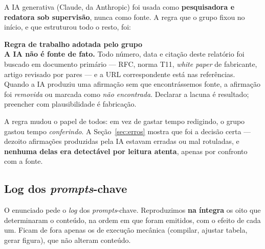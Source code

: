 \documentclass[11pt,a4paper]{article}
\newcommand{\destaque}[2]{%
  \begin{center}\begin{minipage}{0.96\textwidth}
  \colorbox{fundo}{\begin{minipage}{\dimexpr\linewidth-2\fboxsep}
  \vspace{2pt}\textbf{\color{azul}\small #1}\\[1pt]\footnotesize #2\vspace{3pt}
  \end{minipage}}\end{minipage}\end{center}}
\begin{document}
A IA generativa (Claude, da Anthropic) foi usada como \textbf{pesquisadora e redatora sob
supervisão}, nunca como fonte. A regra que o grupo fixou no início, e que estruturou todo o resto,
foi:

\destaque{Regra de trabalho adotada pelo grupo}{%
\textbf{A IA não é fonte de fato.} Todo número, data e citação deste relatório foi buscado em
documento primário --- RFC, norma T11, \textit{white paper} de fabricante, artigo revisado por pares
--- e a URL correspondente está nas referências. Quando a IA produziu uma afirmação sem que
encontrássemos fonte, a afirmação foi \emph{removida} ou marcada como \emph{não encontrada}.
Declarar a lacuna é resultado; preencher com plausibilidade é fabricação.}

A regra mudou o papel de todos: em vez de gastar tempo redigindo, o grupo gastou tempo
\emph{conferindo}. A Seção~\ref{sec:erros} mostra que foi a decisão certa --- dezoito afirmações
produzidas pela IA estavam erradas ou mal rotuladas, e \textbf{nenhuma delas era detectável por
leitura atenta}, apenas por confronto com a fonte.

\subsection{Log dos \textit{prompts}-chave}
\label{sec:prompts}

O enunciado pede o \emph{log} dos \textit{prompts}-chave. Reproduzimos \textbf{na íntegra} os oito
que determinaram o conteúdo, na ordem em que foram emitidos, com o efeito de cada um. Ficam de fora
apenas os de execução mecânica (compilar, ajustar tabela, gerar figura), que não alteram conteúdo.

\newcommand{\promptbox}[3]{%
  \par\smallskip\noindent\textbf{\small \#1 \textbullet\ #2}\par\vspace{2pt}
  \colorbox{fundo}{\begin{minipage}{\dimexpr\linewidth-2\fboxsep}
  \vspace{3pt}\footnotesize\itshape #3 \vspace{3pt}\end{minipage}}\par}

\renewcommand{\promptbox}[3]{%
  \par\smallskip\noindent{\small\textbf{#1} \textbullet\ \textit{#2}}\par\vspace{2pt}
  \colorbox{fundo}{\begin{minipage}{\dimexpr\linewidth-2\fboxsep}
  \vspace{3pt}\footnotesize\itshape #3 \vspace{3pt}\end{minipage}}\par}
\end{document}
